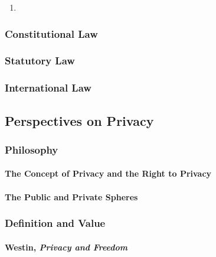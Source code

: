 \begin{enumerate}
    \item %
\end{enumerate}

\subsubsection{Constitutional Law}


\subsubsection{Statutory Law}


\subsubsection{International Law}


\subsection{Perspectives on Privacy}

\subsubsection{Philosophy}

\paragraph{The Concept of Privacy and the Right to Privacy}


\paragraph{The Public and Private Spheres}


\subsubsection{Definition and Value}

\paragraph{Westin, \emph{Privacy and Freedom}}

